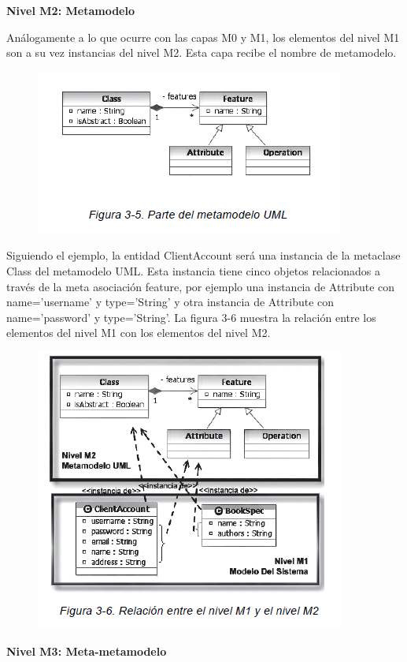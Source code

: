 \textbf{Nivel M2: Metamodelo}

Análogamente a lo que ocurre con las capas M0 y M1, los elementos del
nivel M1 son a su vez instancias del nivel M2. Esta capa recibe el nombre
de metamodelo.

\begin{figure}[H]
\centering
\includegraphics[scale=0.9]{./Imagenes/modelo11}
\end{figure}

Siguiendo el ejemplo, la entidad ClientAccount será una instancia de la
metaclase Class del metamodelo UML. Esta instancia tiene cinco objetos
relacionados a través de la meta asociación feature, por ejemplo una instancia
de Attribute con name=’username’ y type=’String’ y otra instancia
de Attribute con name=’password’ y type=’String’.
La figura 3-6 muestra la relación entre los elementos del nivel M1 con los
elementos del nivel M2.

\begin{figure}[H]
\centering
\includegraphics[scale=0.9]{./Imagenes/modelo12}
\end{figure}


\textbf{Nivel M3: Meta-metamodelo}

